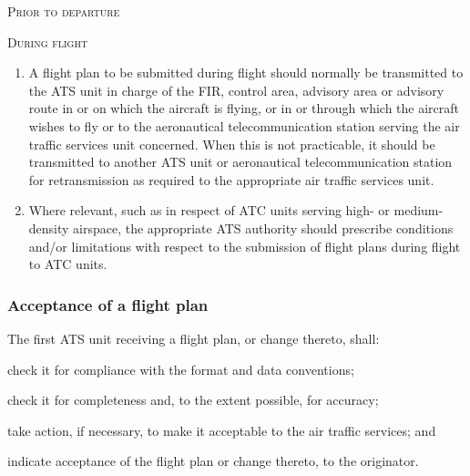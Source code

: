 \begin{enumeratesc}
    \item \textsc{Prior to departure}
    \begin{enumempty}[labelindent=\parindent]
        \item {}
    \end{enumempty}

    \item \textsc{During flight}
    \begin{enumerate}
        \item A flight plan to be submitted during flight should normally be transmitted to the ATS unit in charge of the FIR, control area, advisory area or advisory route in or on which the aircraft is flying, or in or through which the aircraft wishes to fly or to the aeronautical telecommunication station serving the air traffic services unit concerned. When this is not practicable, it should be transmitted to another ATS unit or aeronautical telecommunication station for retransmission as required to the appropriate air traffic services unit.
        \item Where relevant, such as in respect of ATC units serving high- or medium-density airspace, the appropriate ATS authority should prescribe conditions and/or limitations with respect to the submission of flight plans during flight to ATC units.
    \end{enumerate}
\end{enumeratesc}

\subsubsection{Acceptance of a flight plan}

The first ATS unit receiving a flight plan, or change thereto, shall:

\begin{enumalph}
    \item check it for compliance with the format and data conventions;
    \item check it for completeness and, to the extent possible, for accuracy;
    \item take action, if necessary, to make it acceptable to the air traffic services; and
    \item indicate acceptance of the flight plan or change thereto, to the originator.
\end{enumalph}

